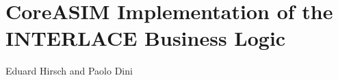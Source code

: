 \chapter{CoreASIM Implementation of the INTERLACE Business Logic}
\label{ch:outlook}

\vspace{-1cm}
\begin{center}
Eduard Hirsch and Paolo Dini
\end{center}

